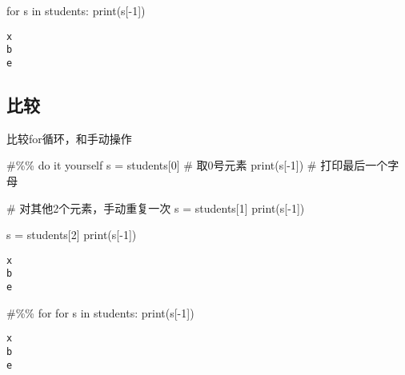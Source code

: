 \documentclass[
  letterpaper,
  DIV=11,
  numbers=noendperiod]{scrreprt}
\newenvironment{Shaded}{\begin{snugshade}}{\end{snugshade}}
\newcommand{\BuiltInTok}[1]{\textcolor[rgb]{0.00,0.23,0.31}{#1}}
\newcommand{\CommentTok}[1]{\textcolor[rgb]{0.37,0.37,0.37}{#1}}
\newcommand{\ControlFlowTok}[1]{\textcolor[rgb]{0.00,0.23,0.31}{#1}}
\newcommand{\DecValTok}[1]{\textcolor[rgb]{0.68,0.00,0.00}{#1}}
\newcommand{\KeywordTok}[1]{\textcolor[rgb]{0.00,0.23,0.31}{#1}}
\newcommand{\NormalTok}[1]{\textcolor[rgb]{0.00,0.23,0.31}{#1}}
\newcommand{\OperatorTok}[1]{\textcolor[rgb]{0.37,0.37,0.37}{#1}}
\begin{document}
\begin{Shaded}
\begin{Highlighting}[]
\ControlFlowTok{for}\NormalTok{ s }\KeywordTok{in}\NormalTok{ students:}
    \BuiltInTok{print}\NormalTok{(s[}\OperatorTok{{-}}\DecValTok{1}\NormalTok{])}
\end{Highlighting}
\end{Shaded}

\begin{verbatim}
x
b
e
\end{verbatim}

\hypertarget{ux6bd4ux8f83}{%
\subsection{比较}\label{ux6bd4ux8f83}}

比较for循环，和手动操作

\begin{Shaded}
\begin{Highlighting}[]
\CommentTok{\#\%\% do it yourself}
\NormalTok{s }\OperatorTok{=}\NormalTok{ students[}\DecValTok{0}\NormalTok{]   }\CommentTok{\# 取0号元素}
\BuiltInTok{print}\NormalTok{(s[}\OperatorTok{{-}}\DecValTok{1}\NormalTok{])      }\CommentTok{\# 打印最后一个字母}

\CommentTok{\# 对其他2个元素，手动重复一次}
\NormalTok{s }\OperatorTok{=}\NormalTok{ students[}\DecValTok{1}\NormalTok{]}
\BuiltInTok{print}\NormalTok{(s[}\OperatorTok{{-}}\DecValTok{1}\NormalTok{])}

\NormalTok{s }\OperatorTok{=}\NormalTok{ students[}\DecValTok{2}\NormalTok{]}
\BuiltInTok{print}\NormalTok{(s[}\OperatorTok{{-}}\DecValTok{1}\NormalTok{])}
\end{Highlighting}
\end{Shaded}

\begin{verbatim}
x
b
e
\end{verbatim}

\begin{Shaded}
\begin{Highlighting}[]
\CommentTok{\#\%\% for}
\ControlFlowTok{for}\NormalTok{ s }\KeywordTok{in}\NormalTok{ students:}
    \BuiltInTok{print}\NormalTok{(s[}\OperatorTok{{-}}\DecValTok{1}\NormalTok{])}
\end{Highlighting}
\end{Shaded}

\begin{verbatim}
x
b
e
\end{verbatim}
\end{document}

